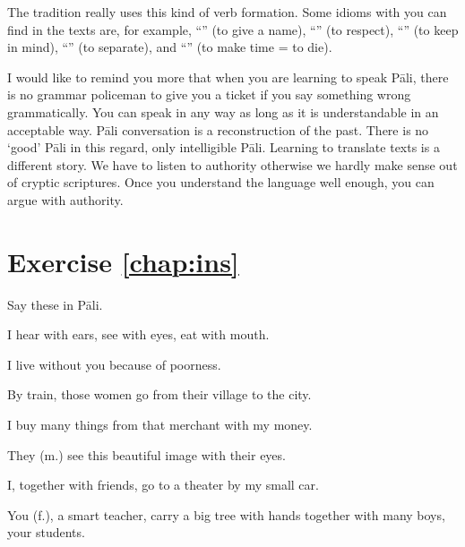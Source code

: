 The tradition really uses this kind of verb formation. Some idioms with  you can find in the texts are, for example, ``'' (to give a name), ``'' (to respect), ``'' (to keep in mind), ``'' (to separate), and ``'' (to make time = to die).

I would like to remind you more that when you are learning to speak P\=ali, there is no grammar policeman to give you a ticket if you say something wrong grammatically. You can speak in any way as long as it is understandable in an acceptable way. P\=ali conversation is a reconstruction of the past. There is no `good' P\=ali in this regard, only intelligible P\=ali. Learning to translate texts is a different story. We have to listen to authority otherwise we hardly make sense out of cryptic scriptures. Once you understand the language well enough, you can argue with authority.

\section*{Exercise \ref{chap:ins}}
Say these in P\=ali.
\begin{compactenum}
\item I hear with ears, see with eyes, eat with mouth.
\item I live without you because of poorness.
\item By train, those women go from their village to the city.
\item I buy many things from that merchant with my money.
\item They (m.) see this beautiful image with their eyes.
\item I, together with friends, go to a theater by my small car.
\item You (f.), a smart teacher, carry a big tree with hands together with many boys, your students.
\end{compactenum}
